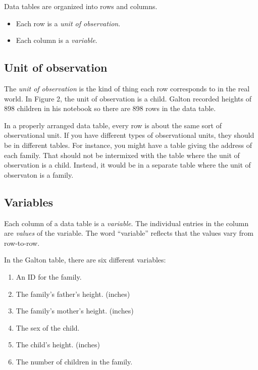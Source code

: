 \documentclass[]{book}
\providecommand{\tightlist}{%
  \setlength{\itemsep}{0pt}\setlength{\parskip}{0pt}}
\theoremstyle{definition}
\theoremstyle{definition}
\theoremstyle{definition}
\theoremstyle{remark}
\begin{document}
Data tables are organized into rows and columns.

\begin{itemize}
\tightlist
\item
  Each row is a \emph{unit of observation}.
\item
  Each column is a \emph{variable}.
\end{itemize}

\subsection{Unit of observation}\label{unit-of-observation}

The \emph{unit of observation} is the kind of thing each row corresponds
to in the real world. In Figure 2, the unit of observation is a child.
Galton recorded heights of 898 children in his notebook so there are 898
rows in the data table.

In a properly arranged data table, every row is about the same sort of
observational unit. If you have different types of observational units,
they should be in different tables. For instance, you might have a table
giving the address of each family. That should not be intermixed with
the table where the unit of observation is a child. Instead, it would be
in a separate table where the unit of observaton is a family.

\subsection{Variables}\label{variables}

Each column of a data table is a \emph{variable}. The individual entries
in the column are \emph{values} of the variable. The word ``variable''
reflects that the values vary from row-to-row.

In the Galton table, there are six different variables:

\begin{enumerate}
\def\labelenumi{\arabic{enumi}.}
\tightlist
\item
  An ID for the family.
\item
  The family's father's height. (inches)
\item
  The family's mother's height. (inches)
\item
  The sex of the child.
\item
  The child's height. (inches)
\item
  The number of children in the family.
\end{enumerate}
\end{document}
